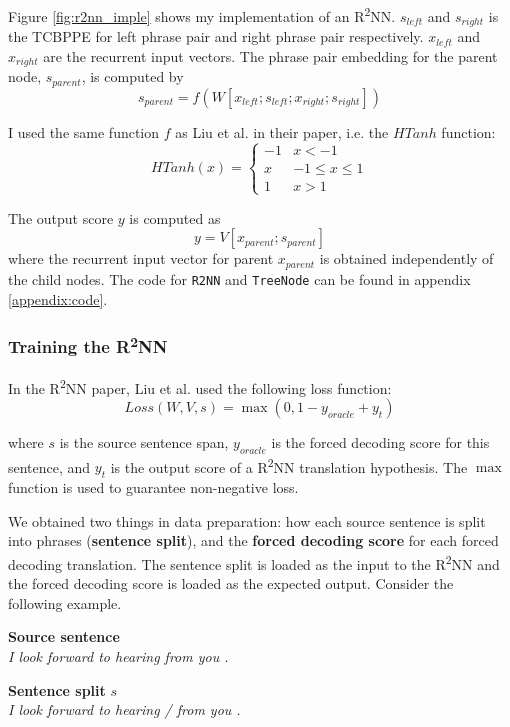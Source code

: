 \documentclass[12pt,a4paper,twoside,openright]{report}
\begin{document}
Figure \ref{fig:r2nn_imple} shows my implementation of an R\textsuperscript{2}NN. $s_{left}$ and $s_{right}$ is the TCBPPE for left phrase pair and right phrase pair respectively. $x_{left}$ and $x_{right}$ are the recurrent input vectors. The phrase pair embedding for the parent node, $s_{parent}$, is computed by
\[ s_{parent} = f(W[x_{left};s_{left};x_{right};s_{right}]) \]

I used the same function $f$ as Liu et al. in their paper\cite{r2nn}, i.e. the $HTanh$ function:
\[ HTanh(x) =
    \begin{cases} 
      -1 & x < -1 \\
      x & -1\leq x\leq 1 \\
      1 & x > 1 
   \end{cases}
\]

The output score $y$ is computed as
\[ y = V[x_{parent}; s_{parent}] \]
where the recurrent input vector for parent $x_{parent}$ is obtained independently of the child nodes. The code for \texttt{R2NN} and \texttt{TreeNode} can be found in appendix \ref{appendix:code}.

\subsubsection{Training the \texorpdfstring{R\textsuperscript{2}NN}{R2NN}}

In the R\textsuperscript{2}NN paper\cite{r2nn}, Liu et al. used the following loss function:
\begin{equation}
\label{eq:loss}
Loss(W,V,s) = \max{(0, 1-y_{oracle} + y_t)}
\end{equation}

where $s$ is the source sentence span, $y_{oracle}$ is the forced decoding score for this sentence, and $y_t$ is the output score of a R\textsuperscript{2}NN translation hypothesis. The $\max$ function is used to guarantee non-negative loss.

We obtained two things in data preparation: how each source sentence is split into phrases (\textbf{sentence split}), and the \textbf{forced decoding score} for each forced decoding translation. The sentence split is loaded as the input to the R\textsuperscript{2}NN and the forced decoding score is loaded as the expected output. Consider the following example.

\textbf{Source sentence}\\
\textit{I look forward to hearing from you .}

\textbf{Sentence split} $s$\\
\textit{I look forward to hearing / from you .}
\end{document}
